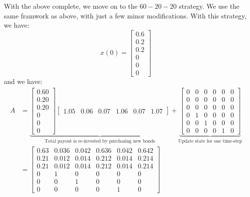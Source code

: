 \documentclass[12pt]{exam}
\begin{document}
\begin{questions}
\begin{solution}
\begin{enumerate}[label=(\alph*)]
      With the above complete, we move on to the $60-20-20$ strategy. We use the same framwork as above, with just a few minor modifications. With this strategy, we have:
      \[
        x(0) = \begin{bmatrix} 0.6 \\ 0.2 \\ 0.2 \\ 0 \\ 0 \\ 0 \end{bmatrix}
      \]
      and we have:
       \begin{align*}
        A &=
          \underbrace{\begin{bmatrix}
            0.60 \\
            0.20 \\
            0.20 \\
            0 \\
            0 \\
            0
          \end{bmatrix}
          \begin{bmatrix}
            1.05 & 0.06 & 0.07 & 1.06 & 0.07 & 1.07
          \end{bmatrix}}_{\text{Total payout is re-invested by purchasing new bonds}}
          + 
          \underbrace{
          \begin{bmatrix}
            0 & 0 & 0 & 0 & 0 & 0 \\
            0 & 0 & 0 & 0 & 0 & 0 \\
            0 & 0 & 0 & 0 & 0 & 0 \\
            0 & 1 & 0 & 0 & 0 & 0 \\
            0 & 0 & 1 & 0 & 0 & 0 \\
            0 & 0 & 0 & 0 & 1 & 0 
          \end{bmatrix}}_{\text{Update state for one time-step}} \\
          &= 
          \begin{bmatrix}
            0.63 & 0.036 & 0.042 & 0.636 & 0.042 & 0.642 \\
            0.21 & 0.012 & 0.014 & 0.212 & 0.014 & 0.214 \\
            0.21 & 0.012 & 0.014 & 0.212 & 0.014 & 0.214 \\
            0 & 1 & 0 & 0 & 0 & 0 \\
            0 & 0 & 1 & 0 & 0 & 0 \\
            0 & 0 & 0 & 0 & 1 & 0 
          \end{bmatrix}

\end{align*}
\end{enumerate}
\end{solution}
\end{questions}
\end{document}
